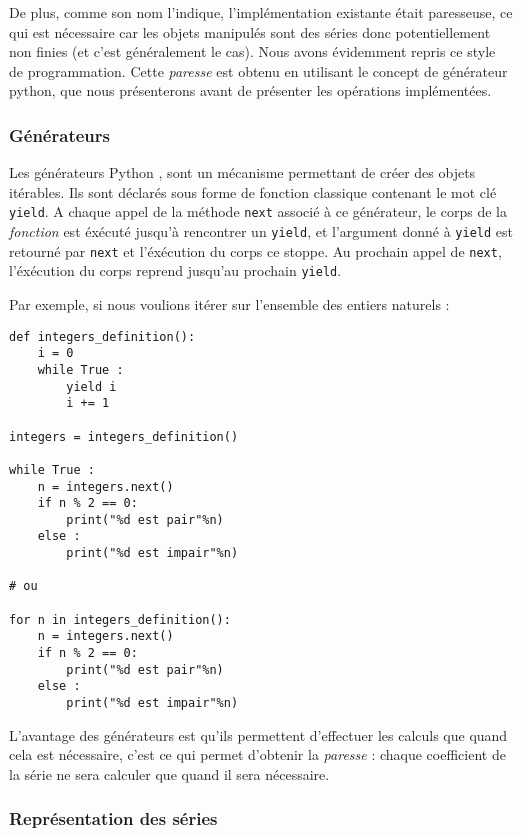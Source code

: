 \documentclass[12pt]{article}
\begin{document}
De plus, comme son nom l'indique, l'implémentation existante était paresseuse, ce qui est
nécessaire car les objets manipulés sont des séries donc potentiellement non
finies (et c'est généralement le cas). Nous avons évidemment repris ce style
de programmation. Cette \emph{paresse} est obtenu en utilisant le concept de
générateur python, que nous présenterons avant de présenter les opérations
implémentées.

\subsubsection{Générateurs}
Les générateurs Python \cite{genpython}, sont un mécanisme permettant de créer
des objets itérables. Ils sont déclarés sous forme de fonction classique
contenant le mot clé \verb|yield|. A chaque appel de la méthode \verb|next|
associé à ce générateur, le corps de la \emph{fonction} est éxécuté jusqu'à
rencontrer un \verb|yield|, et l'argument donné à \verb|yield| est retourné
par \verb|next| et l'éxécution du corps ce stoppe. Au prochain appel de
\verb|next|, l'éxécution du corps reprend jusqu'au prochain \verb|yield|.


Par exemple, si nous voulions itérer sur l'ensemble des entiers naturels :

\noindent\begin{minipage}{\linewidth}
\begin{lstlisting}
def integers_definition():
    i = 0
    while True :
        yield i
        i += 1

integers = integers_definition()

while True :
    n = integers.next()
    if n % 2 == 0:
        print("%d est pair"%n)
    else :
        print("%d est impair"%n)

# ou

for n in integers_definition():
    n = integers.next()
    if n % 2 == 0:
        print("%d est pair"%n)
    else :
        print("%d est impair"%n)
\end{lstlisting}
\end{minipage}

L'avantage des générateurs est qu'ils permettent d'effectuer les calculs que
quand cela est nécessaire, c'est ce qui permet d'obtenir la \emph{paresse} :
chaque coefficient de la série ne sera calculer que quand il sera nécessaire.

\subsubsection{Représentation des séries}
\end{document}
